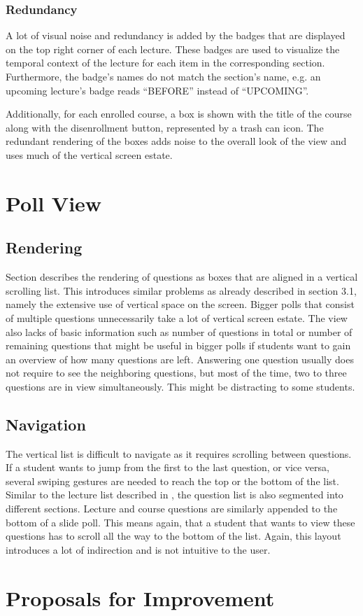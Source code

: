 \subsubsection{Redundancy}

A lot of visual noise and redundancy is added by the badges that are displayed on the top right corner of each lecture. These badges are used to visualize the temporal context of the lecture for each item in the corresponding section. Furthermore, the badge's names do not match the section's name, e.g. an upcoming lecture's badge reads “BEFORE” instead of “UPCOMING”.

Additionally, for each enrolled course, a box is shown with the title of the course along with the disenrollment button, represented by a trash can icon. The redundant rendering of the boxes adds noise to the overall look of the view and uses much of the vertical screen estate.


\section{Poll View}

\subsection{Rendering}

Section \todosct describes the rendering of questions as boxes that are aligned in a vertical scrolling list. This introduces similar problems as already described in section 3.1, namely the extensive use of vertical space on the screen. Bigger polls that consist of multiple questions unnecessarily take a lot of vertical screen estate. The view also lacks of basic information such as number of questions in total or number of remaining questions that might be useful in bigger polls if students want to gain an overview of how many questions are left.
Answering one question usually does not require to see the neighboring questions, but most of the time, two to three questions are in view simultaneously. This might be distracting to some students.

\subsection{Navigation}

The vertical list is difficult to navigate as it requires scrolling between questions. If a student wants to jump from the first to the last question,  or vice versa, several swiping gestures are needed to reach the top or the bottom of the list.
Similar to the lecture list described in \todosct, the question list is also segmented into different sections. Lecture and course questions are similarly appended to the bottom of a slide poll. This means again, that a student that wants to view these questions has to scroll all the way to the bottom of the list. Again, this layout introduces a lot of indirection and is not intuitive to the user.


\section{Proposals for Improvement}
